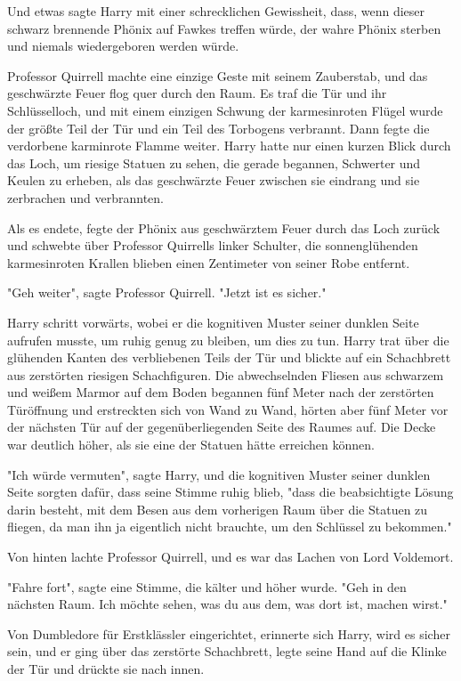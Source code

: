 {Und etwas sagte Harry mit einer schrecklichen Gewissheit, dass, wenn dieser schwarz brennende Phönix auf Fawkes treffen würde, der wahre Phönix sterben und niemals wiedergeboren werden würde.

Professor Quirrell machte eine einzige Geste mit seinem Zauberstab, und das geschwärzte Feuer flog quer durch den Raum. Es traf die Tür und ihr Schlüsselloch, und mit einem einzigen Schwung der karmesinroten Flügel wurde der größte Teil der Tür und ein Teil des Torbogens verbrannt. Dann fegte die verdorbene karminrote Flamme weiter. Harry hatte nur einen kurzen Blick durch das Loch, um riesige Statuen zu sehen, die gerade begannen, Schwerter und Keulen zu erheben, als das geschwärzte Feuer zwischen sie eindrang und sie zerbrachen und verbrannten.

Als es endete, fegte der Phönix aus geschwärztem Feuer durch das Loch zurück und schwebte über Professor Quirrells linker Schulter, die sonnenglühenden karmesinroten Krallen blieben einen Zentimeter von seiner Robe entfernt.

"Geh weiter", sagte Professor Quirrell. "Jetzt ist es sicher."

Harry schritt vorwärts, wobei er die kognitiven Muster seiner dunklen Seite aufrufen musste, um ruhig genug zu bleiben, um dies zu tun. Harry trat über die glühenden Kanten des verbliebenen Teils der Tür und blickte auf ein Schachbrett aus zerstörten riesigen Schachfiguren. Die abwechselnden Fliesen aus schwarzem und weißem Marmor auf dem Boden begannen fünf Meter nach der zerstörten Türöffnung und erstreckten sich von Wand zu Wand, hörten aber fünf Meter vor der nächsten Tür auf der gegenüberliegenden Seite des Raumes auf. Die Decke war deutlich höher, als sie eine der Statuen hätte erreichen können.

"Ich würde vermuten", sagte Harry, und die kognitiven Muster seiner dunklen Seite sorgten dafür, dass seine Stimme ruhig blieb, "dass die beabsichtigte Lösung darin besteht, mit dem Besen aus dem vorherigen Raum über die Statuen zu fliegen, da man ihn ja eigentlich nicht brauchte, um den Schlüssel zu bekommen."

Von hinten lachte Professor Quirrell, und es war das Lachen von Lord Voldemort.

"Fahre fort", sagte eine Stimme, die kälter und höher wurde. "Geh in den nächsten Raum. Ich möchte sehen, was du aus dem, was dort ist, machen wirst."

Von Dumbledore für Erstklässler eingerichtet, erinnerte sich Harry, wird es sicher sein, und er ging über das zerstörte Schachbrett, legte seine Hand auf die Klinke der Tür und drückte sie nach innen.

}

